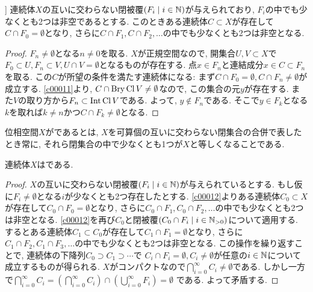 \documentclass[uplatex, dvipdfmx, a4paper, 12pt, class=jsbook, crop=false]{standalone}
\begin{document}
\begin{lemma}{\cite[Lemma~6.1.26]{Engelking1989GT}}]
	\label{c00012}
	連続体$ X $の互いに交わらない閉被覆$ \setfamily{F_i}{i \in \N} $が与えられており,
	$ F_i $の中でも少なくとも2つは非空であるとする.
	このときある連続体$ C \subset X $が存在して$ C \cap F_0 = \emptyset $となり,
	さらに$ C \cap F_1, C \cap F_2, \ldots $の中でも少なくとも2つは非空となる.
\end{lemma}

\begin{proof}
	$ F_n \neq \emptyset $となる$ n \neq 0 $を取る. $ X $が正規空間なので,
	開集合$ U, V \subset X $で$ F_0 \subset U, F_n \subset V, U \cap V = \emptyset $となるものが存在する.
	点$ x \in F_n $と連結成分$ x \in C \subset F_n $を取る.
	この$ C $が所望の条件を満たす連続体になる: まず$ C \cap F_0 = \emptyset, C \cap F_n \neq \emptyset $が成立する.
	\cref{c00011}より, $ C \cap \mathop{\mathrm{Bry}}\nolimits\mathop{\mathrm{Cl}}\nolimits V \neq \emptyset $なので, この集合の元$ y $が存在する.
	また$ V $の取り方から$ F_n \subset \mathop{\mathrm{Int}}\nolimits \mathop{\mathrm{Cl}}\nolimits V $である.
	よって, $ y \notin F_n $である.
	そこで$ y \in F_k $となる$ k $を取れば$ k \neq n $かつ$ C \cap F_k \neq \emptyset $となる.
\end{proof}

\begin{definition}
	位相空間$ X $がであるとは,
	$ X $を可算個の互いに交わらない閉集合の合併で表したとき常に,
	それら閉集合の中で少なくとも1つが$ X $と等しくなることである.
\end{definition}

\begin{theorem}
	\label{c00013}
	連続体$X$は\sigmaConnected である.
\end{theorem}

\begin{proof}
	$ X $の互いに交わらない閉被覆$ \setfamily{F_i}{i \in \N} $が与えられているとする.
	もし仮に$ F_i \neq \emptyset $となる$ i $が少なくとも2つ存在したとする.
	\cref{c00012}よりある連続体$ C_0 \subset X $が存在して$ C_0 \cap  F_0 = \emptyset$となり,
	さらに$ C_0 \cap F_1, C_0 \cap F_2, \ldots $の中でも少なくとも2つは非空となる.
	\cref{c00012}を再び$ C_0 $と閉被覆$ \setfamily{C_0 \cap F_i}{i \in \N_{>0}} $について適用する.
	するとある連続体$ C_1 \subset C_0 $が存在して$ C_1 \cap  F_1 = \emptyset$となり,
	さらに$ C_1 \cap F_2, C_1 \cap F_3, \ldots $の中でも少なくとも2つは非空となる.
	この操作を繰り返すことで, 連続体の下降列$ C_0 \supset C_1 \supset \cdots $で
	$ C_i \cap F_i = \emptyset, C_i \neq \emptyset $が任意の$ i \in \mathbb{N} $について成立するものが得られる.
	$ X $がコンパクトなので$ \bigcap_{i=0}^{\infty} C_i \neq \emptyset $である.
	しかし一方で$ \bigcap_{i=0}^{\infty} C_i
	= \left(\bigcap_{i=0}^{\infty} C_i \right) \cap \left( \bigcup_{i=0}^{\infty} F_i \right) = \emptyset $ である. よって矛盾する.
\end{proof}
\end{document}
